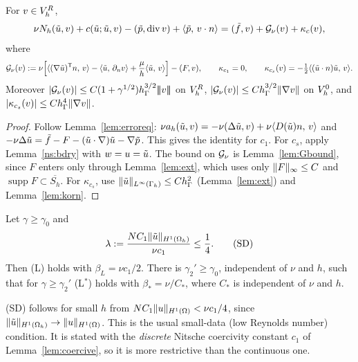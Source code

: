 \begin{lemma}\label{ns:erreq}
For $v\in V_h^R$,
\[
\nu N_h(\tilde u,v)+c(\tilde u;\tilde u,v)-(\tilde p,\operatorname{div} v)+\langle \tilde p,\, v\cdot n\rangle=(\tilde f,v)+\mathcal G_\nu(v)+\kappa_c(v),
\]
where
\[
\mathcal G_\nu(v):=\nu\Bigl[\langle (\nabla\tilde u)^{\mathsf T}n,\, v\rangle-\langle \tilde u,\, \partial_n v\rangle+\frac\mu h\langle \tilde u,\, v\rangle\Bigr]-(F,v),
\qquad \kappa_{c_1}=0,\qquad \kappa_{c_s}(v)=-\tfrac12\langle (\tilde u\cdot n)\tilde u,\, v\rangle.
\]
Moreover $|\mathcal G_\nu(v)|\le C(1+\gamma^{1/2})h_\Gamma^{3/2}|\!|\!|v|\!|\!|$ on $V_h^R$, $|\mathcal G_\nu(v)|\le Ch_\Gamma^{3/2}\lVert \nabla v\rVert$ on $V_h^0$, and $|\kappa_{c_s}(v)|\le Ch_\Gamma^4\lVert \nabla v\rVert$.
\end{lemma}

\begin{proof}
Follow Lemma~\ref{lem:erroreq}: $\nu a_h(\tilde u,v)=-\nu(\Delta\tilde u,v)+\nu\langle D(\tilde u)n,\, v\rangle$ and $-\nu\Delta\tilde u=\tilde f-F-(\tilde u\cdot\nabla)\tilde u-\nabla\tilde p$. This gives the identity for $c_1$. For $c_s$, apply Lemma~\ref{ns:bdry} with $w=u=\tilde u$. The bound on $\mathcal G_\nu$ is Lemma~\ref{lem:Gbound}, since $F$ enters only through Lemma~\ref{lem:ext}, which uses only $\lVert F\rVert_\infty\le C$ and $\operatorname{supp}F\subset\overline{S_h}$. For $\kappa_{c_s}$, use $\lVert \tilde u\rVert_{L^\infty(\Gamma_h)}\le Ch_\Gamma^2$ (Lemma~\ref{lem:ext}) and Lemma~\ref{lem:korn}.
\end{proof}

\begin{lemma}\label{ns:SD}
Let $\gamma\ge\gamma_0$ and
\[
\lambda:=\frac{N C_1\lVert \tilde u\rVert_{H^1(\Omega_h)}}{\nu c_1}\le\frac14 .\tag{SD}
\]
Then (L) holds with $\beta_L=\nu c_1/2$. There is $\gamma_2'\ge\gamma_0$, independent of $\nu$ and $h$, such that for $\gamma\ge\gamma_2'$ (L$^\ast$) holds with $\beta_\ast=\nu/C_\ast$, where $C_\ast$ is independent of $\nu$ and $h$.
\end{lemma}

(SD) follows for small $h$ from $NC_1\lVert u\rVert_{H^1(\Omega)}<\nu c_1/4$, since $\lVert \tilde u\rVert_{H^1(\Omega_h)}\to\lVert u\rVert_{H^1(\Omega)}$. This is the usual small-data (low Reynolds number) condition. It is stated with the \emph{discrete} Nitsche coercivity constant $c_1$ of Lemma~\ref{lem:coercive}, so it is more restrictive than the continuous one.

